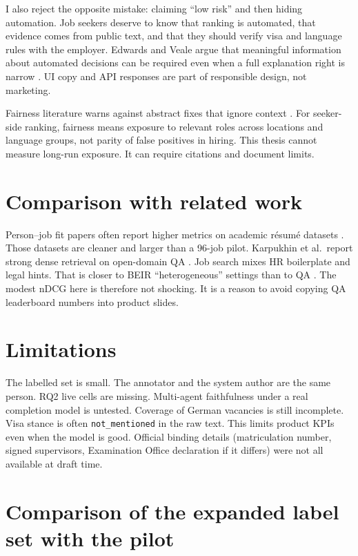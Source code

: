 I also reject the opposite mistake: claiming ``low risk'' and then hiding automation. Job seekers deserve to know that ranking is automated, that evidence comes from public text, and that they should verify visa and language rules with the employer. Edwards and Veale argue that meaningful information about automated decisions can be required even when a full explanation right is narrow . UI copy and API responses are part of responsible design, not marketing.

Fairness literature warns against abstract fixes that ignore context . For seeker-side ranking, fairness means exposure to relevant roles across locations and language groups, not parity of false positives in hiring. This thesis cannot measure long-run exposure. It can require citations and document limits.

\section{Comparison with related work}
\label{sec:compare-lit}

Person--job fit papers often report higher metrics on academic résumé datasets . Those datasets are cleaner and larger than a 96-job pilot. Karpukhin et al.\ report strong dense retrieval on open-domain QA . Job search mixes HR boilerplate and legal hints. That is closer to BEIR ``heterogeneous'' settings than to QA . The modest nDCG here is therefore not shocking. It is a reason to avoid copying QA leaderboard numbers into product slides.

\section{Limitations}
\label{sec:limitations}

The labelled set is small. The annotator and the system author are the same person. RQ2 live cells are missing. Multi-agent faithfulness under a real completion model is untested. Coverage of German vacancies is still incomplete. Visa stance is often \texttt{not\_mentioned} in the raw text. This limits product KPIs even when the model is good. Official binding details (matriculation number, signed supervisors, Examination Office declaration if it differs) were not all available at draft time.

\section{Comparison of the expanded label set with the pilot}
\label{sec:label-scale}

